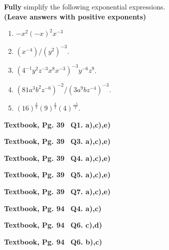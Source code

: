 \documentclass[12pt]{article} %
\begin{document}
  \begin{qstn}
    \textbf{Fully }simplify the following exponential expressions.\\ \textbf{(Leave answers with positive exponents)}
    \begin{enumerate}[label=(\alph*)]
      \item $-x^2(-x)^2x^{-3}$
                      \newpage
      \item $\left( x^{-4} \right) / \left( y^{2} \right)^{-3}  $.
      \item $\left( 4^{-1}y^2z^{-3}x^{8}x^{-3} \right)^{-3}y^{-6}z^{9}$.
      \item $\left( 81a^{3}b^{2}z^{-6} \right)^{-2}  / \left( 3a^{9}bz^{-4} \right)^{-3}$.
      \item $\left( 16 \right)^{\frac{3}{2}}\left( 9 \right)^{\frac{3}{2}} \left( 4\right) ^{\frac{-5}{2}} $.
    \end{enumerate}
  \end{qstn}
    
  \begin{qstn}
    \textbf{Textbook, Pg. 39\,\,\, Q1. a),c),e)}
  \end{qstn}

  \begin{qstn}
    \textbf{Textbook, Pg. 39\,\,\, Q3. a),c),e)}
  \end{qstn}

  \begin{qstn}
    \textbf{Textbook, Pg. 39\,\,\, Q4. a),c),e)}
  \end{qstn}

  \begin{qstn}
    \textbf{Textbook, Pg. 39\,\,\, Q5. a),c),e)}
  \end{qstn}
    
  \begin{qstn}
    \textbf{Textbook, Pg. 39\,\,\, Q7. a),c),e)}
  \end{qstn}

  \begin{qstn}
    \textbf{Textbook, Pg. 94\,\,\, Q4. a),c)}
  \end{qstn}

  \begin{qstn}
    \textbf{Textbook, Pg. 94\,\,\, Q6. c),d)}
  \end{qstn}

  \begin{qstn}
    \textbf{Textbook, Pg. 94\,\,\, Q6. b),c)}
  \end{qstn}
\end{document}
